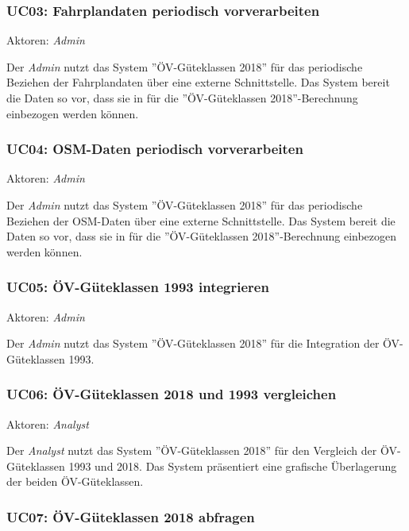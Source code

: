 \subsubsection{UC03: Fahrplandaten periodisch vorverarbeiten}
\label{Use Cases:UC03}

Aktoren: \emph{Admin}

Der \emph{Admin} nutzt das System ''\acs{ÖV}-Güteklassen 2018'' für das periodische Beziehen der Fahrplandaten über eine externe Schnittstelle.
Das System bereit die Daten so vor, dass sie in  für die ''\acs{ÖV}-Güteklassen 2018''-Berechnung einbezogen werden können.

\subsubsection{UC04: OSM-Daten periodisch vorverarbeiten}
\label{Use Cases:UC04}

Aktoren: \emph{Admin}

Der \emph{Admin} nutzt das System ''\acs{ÖV}-Güteklassen 2018'' für das periodische Beziehen der \acs{OSM}-Daten über eine externe Schnittstelle.
Das System bereit die Daten so vor, dass sie in  für die ''\acs{ÖV}-Güteklassen 2018''-Berechnung einbezogen werden können.


\subsubsection{UC05: ÖV-Güteklassen 1993 integrieren}
\label{Use Cases:UC05}

Aktoren: \emph{Admin}

Der \emph{Admin} nutzt das System ''\acs{ÖV}-Güteklassen 2018'' für die Integration der ÖV-Güteklassen 1993.

\subsubsection{UC06: ÖV-Güteklassen 2018 und 1993 vergleichen}
\label{Use Cases:UC06}

Aktoren: \emph{Analyst}

Der \emph{Analyst} nutzt das System ''\acs{ÖV}-Güteklassen 2018'' für den Vergleich der \acs{ÖV}-Güteklassen 1993 und 2018.
Das System präsentiert eine grafische Überlagerung der beiden \acs{ÖV}-Güteklassen.

\subsubsection{UC07: ÖV-Güteklassen 2018 abfragen}
\label{Use Cases:UC07}


